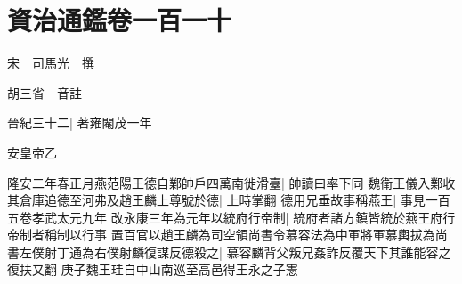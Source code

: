 \section{資治通鑑卷一百一十}
宋　司馬光　撰

胡三省　音註

晉紀三十二|{
	著雍閹茂一年}


安皇帝乙

隆安二年春正月燕范陽王德自鄴帥戶四萬南徙滑臺|{
	帥讀曰率下同}
魏衛王儀入鄴收其倉庫追德至河弗及趙王麟上尊號於德|{
	上時掌翻}
德用兄垂故事稱燕王|{
	事見一百五卷孝武太元九年}
改永康三年為元年以統府行帝制|{
	統府者諸方鎮皆統於燕王府行帝制者稱制以行事}
置百官以趙王麟為司空領尚書令慕容法為中軍將軍慕輿拔為尚書左僕射丁通為右僕射麟復謀反德殺之|{
	慕容麟背父叛兄姦詐反覆天下其誰能容之復扶又翻}
庚子魏王珪自中山南巡至高邑得王永之子憲

